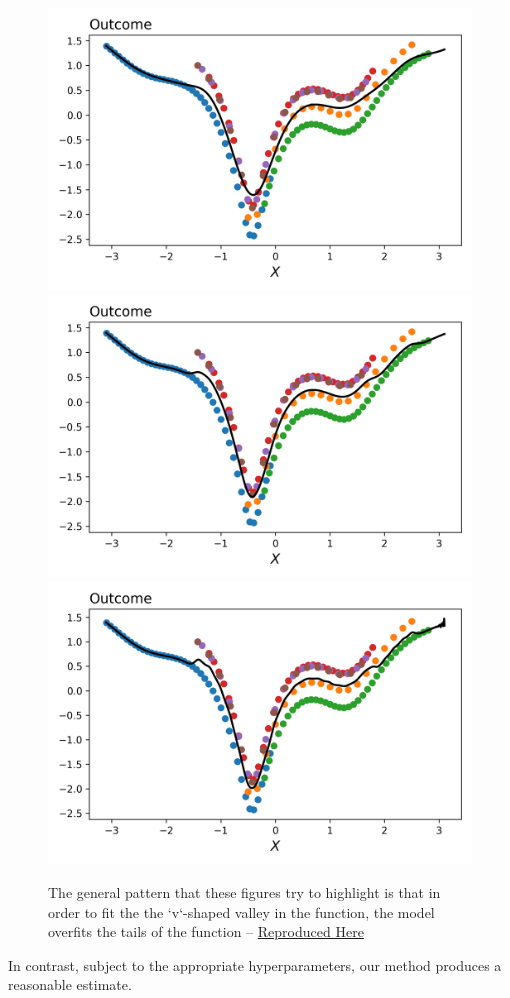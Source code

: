 \documentclass[a4paper,12pt]{article}
\begin{document}
\begin{figure}[htbp]
\includegraphics[scale=0.3]{figures/framework/local_linear_no_const_5.0_18_LM.png}
\includegraphics[scale=0.3]{figures/framework/local_linear_no_const_10.0_18_LM.png}
\includegraphics[scale=0.3]{figures/framework/local_linear_no_const_15.0_18_LM.png}
\caption{The general pattern that these figures try to highlight is that in order to fit the the `v`-shaped valley in the function, the model overfits the tails of the function -- \href{https://github.com/pharringtonp19/rfp/blob/main/notebooks/local_weighted_linear_regression_no_avg_effect_LM.ipynb}{Reproduced Here}}
\label{fig:nonparametrics}
\end{figure}
In contrast, subject to the appropriate hyperparameters, our method produces a reasonable estimate.
\end{document}

